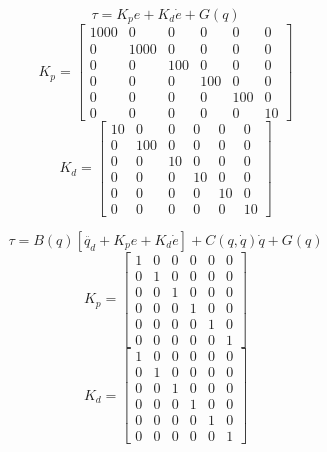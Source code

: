 \documentclass[a4paper]{article}
\begin{document}
\begin{equation}
\tau = K_p e + K_d \dot{e} + G(q)
\end{equation}
\begin{equation}
K_p = 
\begin{bmatrix}
1000 & 0 & 0	& 0 & 0 & 0 \\
0 & 1000 & 0 & 0 & 0 & 0 \\
0 & 0 & 100 & 0 & 0 & 0 \\
0 & 0 & 0 & 100 & 0 & 0 \\
0 & 0 & 0 & 0 & 100 & 0 \\
0 & 0 & 0 & 0 & 0 & 10
\end{bmatrix}
\end{equation}
\begin{equation}
K_d = 
\begin{bmatrix}
10 & 0 & 0	& 0 & 0 & 0 \\
0 & 100 & 0 & 0 & 0 & 0 \\
0 & 0 & 10 & 0 & 0 & 0 \\
0 & 0 & 0 & 10 & 0 & 0 \\
0 & 0 & 0 & 0 & 10 & 0 \\
0 & 0 & 0 & 0 & 0 & 10
\end{bmatrix}
\end{equation}

\begin{equation}
\tau = B(q)[\ddot{q_d} + K_p e + K_d \dot{e}] + C(q,\dot{q})\dot{q} + G(q)
\end{equation}
\begin{equation}
K_p = 
\begin{bmatrix}
1 & 0 & 0	& 0 & 0 & 0 \\
0 & 1 & 0 & 0 & 0 & 0 \\
0 & 0 & 1 & 0 & 0 & 0 \\
0 & 0 & 0 & 1 & 0 & 0 \\
0 & 0 & 0 & 0 & 1 & 0 \\
0 & 0 & 0 & 0 & 0 & 1
\end{bmatrix}
\end{equation}
\begin{equation}
K_d = 
\begin{bmatrix}
1 & 0 & 0	& 0 & 0 & 0 \\
0 & 1 & 0 & 0 & 0 & 0 \\
0 & 0 & 1 & 0 & 0 & 0 \\
0 & 0 & 0 & 1 & 0 & 0 \\
0 & 0 & 0 & 0 & 1 & 0 \\
0 & 0 & 0 & 0 & 0 & 1
\end{bmatrix}
\end{equation}
\end{document}

